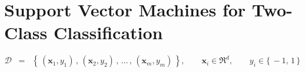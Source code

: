 \documentclass{article}
\begin{document}


\pagestyle{fancy}

%

\lfoot[]{}
\cfoot[]{}
\rfoot[]{\thepage}


\newcommand{\dist}{\textnormal{dist}}


\section{Support Vector Machines for Two-Class Classification}
\setcounter{theorem}{0}

\begin{equation*}
\mathcal{D} \;\; = \;\; \left\{\,(\mathbf{x}_{1},y_{1})\,,\,(\mathbf{x}_{2},y_{2})\,,\,\ldots\,,\,(\mathbf{x}_{m},y_{m})\,\right\},
\quad\quad
\mathbf{x}_{i} \in \Re^{d},
\quad\quad
y_{i} \in \{\,-1,\,1\,\}
\end{equation*}
\end{document}
